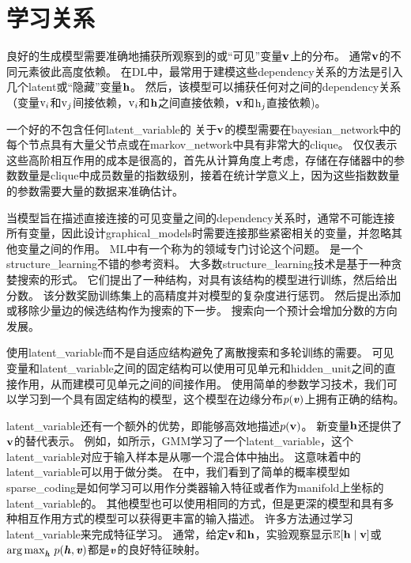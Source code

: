 \section{学习关系}
\label{sec:learning_about_dependencies}

良好的生成模型需要准确地捕获所观察到的或``可见''变量$\mathbf{v}$上的分布。
通常$\mathbf{v}$的不同元素彼此高度依赖。
在\gls{DL}中，最常用于建模这些\gls{dependency}关系的方法是引入几个\gls{latent}或``隐藏''变量$\mathbf{h}$。
然后，该模型可以捕获任何对之间的\gls{dependency}关系（变量$\mathrm{v}_i$和$\mathrm{v}_j$间接依赖，$\mathrm{v}_i$和$\mathbf{h}$之间直接依赖，$\mathbf{v}$和$\mathrm{h}_j$直接依赖)。%

一个好的不包含任何\gls{latent_variable}的 关于$\mathbf{v}$的模型需要在\gls{bayesian_network}中的每个节点具有大量父节点或在\gls{markov_network}中具有非常大的\gls{clique}。
仅仅表示这些高阶相互作用的成本是很高的，首先从计算角度上考虑，存储在存储器中的参数数量是\gls{clique}中成员数量的指数级别，接着在统计学意义上，因为这些指数数量的参数需要大量的数据来准确估计。


当模型旨在描述直接连接的可见变量之间的\gls{dependency}关系时，通常不可能连接所有变量，因此设计\gls{graphical_models}时需要连接那些紧密相关的变量，并忽略其他变量之间的作用。
\gls{ML}中有一个称为的领域专门讨论这个问题。
\citet{koller-book2009}是一个\gls{structure_learning}不错的参考资料。
大多数\gls{structure_learning}技术是基于一种贪婪搜索的形式。
它们提出了一种结构，对具有该结构的模型进行训练，然后给出分数。 
该分数奖励训练集上的高精度并对模型的复杂度进行惩罚。
然后提出添加或移除少量边的候选结构作为搜索的下一步。
搜索向一个预计会增加分数的方向发展。 %


使用\gls{latent_variable}而不是自适应结构避免了离散搜索和多轮训练的需要。 
可见变量和\gls{latent_variable}之间的固定结构可以使用可见单元和\gls{hidden_unit}之间的直接作用，从而建模可见单元之间的间接作用。
使用简单的参数学习技术，我们可以学习到一个具有固定结构的模型，这个模型在边缘分布$p(\boldsymbol{\mathit{v}})$上拥有正确的结构。


\gls{latent_variable}还有一个额外的优势，即能够高效地描述$p(\mathbf{v})$。%
新变量$\mathbf{h}$还提供了$\mathbf{v}$的替代表示。
例如，如所示，\gls{GMM}学习了一个\gls{latent_variable}，这个\gls{latent_variable}对应于输入样本是从哪一个混合体中抽出。
这意味着中的\gls{latent_variable}可以用于做分类。
在中，我们看到了简单的概率模型如\gls{sparse_coding}是如何学习可以用作分类器输入特征或者作为\gls{manifold}上坐标的\gls{latent_variable}的。
其他模型也可以使用相同的方式，但是更深的模型和具有多种相互作用方式的模型可以获得更丰富的输入描述。
许多方法通过学习\gls{latent_variable}来完成特征学习。
通常，给定$\mathbf{v}$和$\mathbf{h}$，实验观察显示$\mathbb{E}[\mathbf{h}\mid\mathbf{v}]$或${\arg\max}_{\boldsymbol{\mathit{h}}}\ p(\boldsymbol{\mathit{h}},\boldsymbol{\mathit{v}})$都是$\boldsymbol{\mathit{v}}$的良好特征映射。

